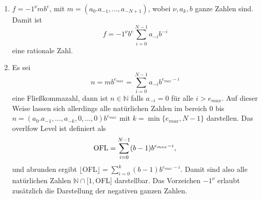 \begin{enumerate}
	\item $f = -1^{\nu} m b ^{e}$, mit $m=(a_0 . a_{-1}, \dots, a_{-N+1})$, 
wobei $\nu, a_k, b$ ganze Zahlen sind. Damit ist
$$
	f = -1^{\nu} b^e \sum_{i=0}^{N-1} a_{-i} b^{-i} 
$$
eine rationale Zahl.
	\item Es sei $$n = m b^{e_{max}} = \sum_{i=0}^{N-1} a_{-i} b^{e_{max}-i}$$ 
	eine Fließkommazahl, dann ist $n \in \mathbb{N}$ falls $a_{-i}=0$ für alle $i > e_{max}$. 		
	Auf dieser Weise lassen sich allerdings alle natürlichen Zahlen im bereich $0$ bis 
	$n=(a_0 . a_{-1}, \dots, a_{-k}, 0, \dots, 0) b^{e_{max}}$ mit $k = \min \lbrace e_{max}, N-1 \rbrace$ darstellen.
	Das overlfow Level ist definiert als 
	$$
		\textnormal{OFL} = \sum_{i=0}^{N-1} (b-1) b^{e_{max}-i},
	$$
	und abrunden ergibt $\lfloor$OFL$\rfloor = \sum_{i=0}^k (b-1) b^{e_{max}-i}$.
	Damit sind also alle natürlichen Zahlen $\mathbb{N} \cap [1,$OFL$]$ 			
	darstellbar. Das Vorzeichen $-1^\nu$ erlaubt zusätzlich die Darstellung der negativen ganzen Zahlen.
\end{enumerate}
